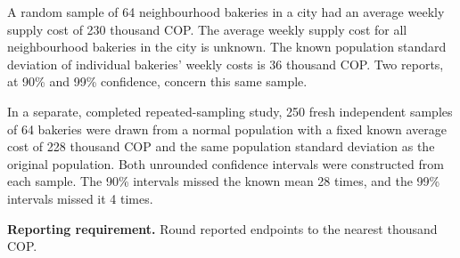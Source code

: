 
\vfill


\clearpage
{}
A random sample of 64 neighbourhood bakeries in a city had an average weekly supply cost of 230 thousand COP. The average weekly supply cost for all neighbourhood bakeries in the city is unknown. The known population standard deviation of individual bakeries' weekly costs is 36 thousand COP. Two reports, at 90\% and 99\% confidence, concern this same sample.

In a separate, completed repeated-sampling study, 250 fresh independent samples of 64 bakeries were drawn from a normal population with a fixed known average cost of 228 thousand COP and the same population standard deviation as the original population. Both unrounded confidence intervals were constructed from each sample. The 90\% intervals missed the known mean 28 times, and the 99\% intervals missed it 4 times.

\textbf{Reporting requirement.} Round reported endpoints to the nearest thousand COP.


\BlankInformationTable

\clearpage
{}

